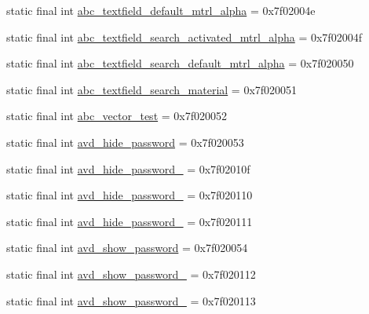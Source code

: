 \begin{CompactItemize}
static final int \hyperlink{classandroid_1_1support_1_1v7_1_1mediarouter_1_1_r_1_1drawable_caae6f8f9880f078a69ea6cd455f6fcc}{abc\_\-textfield\_\-default\_\-mtrl\_\-alpha} = 0x7f02004e
\item 
static final int \hyperlink{classandroid_1_1support_1_1v7_1_1mediarouter_1_1_r_1_1drawable_49845e9d747d8227dfe98536896d712e}{abc\_\-textfield\_\-search\_\-activated\_\-mtrl\_\-alpha} = 0x7f02004f
\item 
static final int \hyperlink{classandroid_1_1support_1_1v7_1_1mediarouter_1_1_r_1_1drawable_f01e2b0ddfae3d776e5169da24e2d3a0}{abc\_\-textfield\_\-search\_\-default\_\-mtrl\_\-alpha} = 0x7f020050
\item 
static final int \hyperlink{classandroid_1_1support_1_1v7_1_1mediarouter_1_1_r_1_1drawable_a12764213de1808a2941364a51cd95bd}{abc\_\-textfield\_\-search\_\-material} = 0x7f020051
\item 
static final int \hyperlink{classandroid_1_1support_1_1v7_1_1mediarouter_1_1_r_1_1drawable_833d9459b6fb309620aa2e20bb056748}{abc\_\-vector\_\-test} = 0x7f020052
\item 
static final int \hyperlink{classandroid_1_1support_1_1v7_1_1mediarouter_1_1_r_1_1drawable_9ab54f7f38df729f346415c07bbb21b7}{avd\_\-hide\_\-password} = 0x7f020053
\item 
static final int \hyperlink{classandroid_1_1support_1_1v7_1_1mediarouter_1_1_r_1_1drawable_4bf0fcefdedb27af4aa760caf76806c8}{avd\_\-hide\_\-password\_} = 0x7f02010f
\item 
static final int \hyperlink{classandroid_1_1support_1_1v7_1_1mediarouter_1_1_r_1_1drawable_003b49db7141505880803a5ae49fbed8}{avd\_\-hide\_\-password\_} = 0x7f020110
\item 
static final int \hyperlink{classandroid_1_1support_1_1v7_1_1mediarouter_1_1_r_1_1drawable_14ffcd5efd7aea54e0af9751f359b3fd}{avd\_\-hide\_\-password\_} = 0x7f020111
\item 
static final int \hyperlink{classandroid_1_1support_1_1v7_1_1mediarouter_1_1_r_1_1drawable_7e3e852826edadfcb50b6612fc639d7f}{avd\_\-show\_\-password} = 0x7f020054
\item 
static final int \hyperlink{classandroid_1_1support_1_1v7_1_1mediarouter_1_1_r_1_1drawable_f12b94a3b72a03d32b8257147cee3b17}{avd\_\-show\_\-password\_} = 0x7f020112
\item 
static final int \hyperlink{classandroid_1_1support_1_1v7_1_1mediarouter_1_1_r_1_1drawable_260cb12667262c98a7fbb8391d29a0ae}{avd\_\-show\_\-password\_} = 0x7f020113
\item 

\end{CompactItemize}
